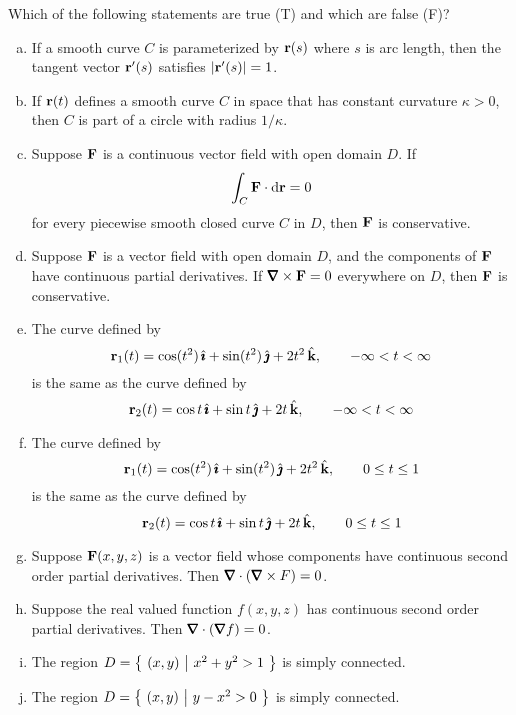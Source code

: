 \begin{question}[M317 2007A] %
Which of the following statements are true (T) and which are false (F)?
\begin{enumerate}[(a)]
\item
If a smooth curve $C$ is parameterized by $\mathbf{r}(s)$ where $s$ 
is arc length, then the tangent vector $\mathbf{r}'(s)$ satisfies 
$|\mathbf{r}'(s)| = 1$.
\item
If $\mathbf{r}(t)$ defines a smooth curve $C$ in space that has constant 
curvature $\kappa > 0$, then $C$ is part of a circle with radius $1/\kappa$.
\item
Suppose $\mathbf{F}$ is a continuous vector field with open domain $D$. If
\begin{equation*}
\int_C \mathbf{F} \cdot \mathrm{d}\mathbf{r} = 0
\end{equation*}
for every piecewise smooth closed curve $C$ in $D$, then $\mathbf{F}$ is conservative.
\item
Suppose $\mathbf{F}$ is a vector field with open domain $D$, and the components 
of $\mathbf{F}$ have continuous partial derivatives. If $\vnabla\times \vF= 0$ everywhere on $D$, then $\mathbf{F}$ is conservative.
\item
The curve defined by
\begin{equation*}
\mathbf{r}_1(t) = \cos(t^2)\,\hat{\pmb{\imath}} + \sin(t^2)\,\hat{\pmb{\jmath}} + 2t^2\,\hat{\mathbf{k}},\qquad
-\infty < t < \infty
\end{equation*}
is the same as the curve defined by
\begin{equation*}
\mathbf{r}_2 (t) = \cos t\,\hat{\pmb{\imath}} + \sin t\,\hat{\pmb{\jmath}} + 2t\,\hat{\mathbf{k}},\qquad
-\infty < t < \infty
\end{equation*}
\item
The curve defined by
\begin{equation*}
\mathbf{r}_1(t) = \cos(t^2)\,\hat{\pmb{\imath}} + \sin(t^2)\,\hat{\pmb{\jmath}} + 2t^2\,\hat{\mathbf{k}},\qquad
0\le t \le 1
\end{equation*}
is the same as the curve defined by
\begin{equation*}
\mathbf{r}_2 (t) = \cos t\,\hat{\pmb{\imath}} + \sin t\,\hat{\pmb{\jmath}} + 2t\,\hat{\mathbf{k}},\qquad
0\le t\le 1
\end{equation*}
\item
Suppose $\mathbf{F}(x, y, z)$ is a vector field whose components have 
continuous second order partial derivatives. Then 
$\vnabla \cdot (\vnabla  \times F) = 0$.
\item
Suppose the real valued function $f(x, y, z)$ has continuous second 
order partial derivatives. Then $\vnabla\cdot(\vnabla f) = 0$.
\item
The region $D = \big\{ \  (x, y) \ \big|\  x^2 + y^2 > 1 \ \big\}$ is simply connected.
\item
The region $D = \big\{ \  (x, y) \ \big|\  y - x^2 > 0 \ \big\}$ is simply connected.


\end{enumerate}
\end{question}

